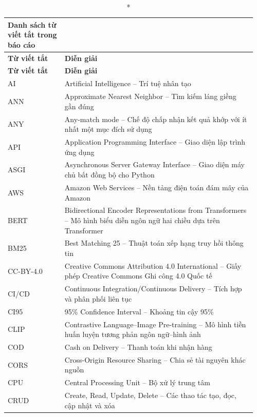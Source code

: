 
\begin{longtable}{|p{0.22\linewidth}|p{0.74\linewidth}|}
\caption*{Danh sách từ viết tắt trong báo cáo} \\ \hline
\textbf{Từ viết tắt} & \textbf{Diễn giải} \\ \hline
\endfirsthead

\hline
\textbf{Từ viết tắt} & \textbf{Diễn giải} \\ \hline
\endhead
AI & Artificial Intelligence -- Trí tuệ nhân tạo \\ \hline
ANN & Approximate Nearest Neighbor -- Tìm kiếm láng giềng gần đúng \\ \hline
ANY & Any-match mode -- Chế độ chấp nhận kết quả khớp với ít nhất một mục đích sử dụng \\ \hline
API & Application Programming Interface -- Giao diện lập trình ứng dụng \\ \hline
ASGI & Asynchronous Server Gateway Interface -- Giao diện máy chủ bất đồng bộ cho Python \\ \hline
AWS & Amazon Web Services -- Nền tảng điện toán đám mây của Amazon \\ \hline
BERT & Bidirectional Encoder Representations from Transformers -- Mô hình biểu diễn ngôn ngữ hai chiều dựa trên Transformer \\ \hline
BM25 & Best Matching 25 -- Thuật toán xếp hạng truy hồi thông tin \\ \hline
CC-BY-4.0 & Creative Commons Attribution 4.0 International -- Giấy phép Creative Commons Ghi công 4.0 Quốc tế \\ \hline
CI/CD & Continuous Integration/Continuous Delivery -- Tích hợp và phân phối liên tục \\ \hline
CI95 & 95\% Confidence Interval -- Khoảng tin cậy 95\% \\ \hline
CLIP & Contrastive Language--Image Pre-training -- Mô hình tiền huấn luyện tương phản ngôn ngữ--hình ảnh \\ \hline
COD & Cash on Delivery -- Thanh toán khi nhận hàng \\ \hline
CORS & Cross-Origin Resource Sharing -- Chia sẻ tài nguyên khác nguồn \\ \hline
CPU & Central Processing Unit -- Bộ xử lý trung tâm \\ \hline
CRUD & Create, Read, Update, Delete -- Các thao tác tạo, đọc, cập nhật và xóa \\ \hline

\end{longtable}

